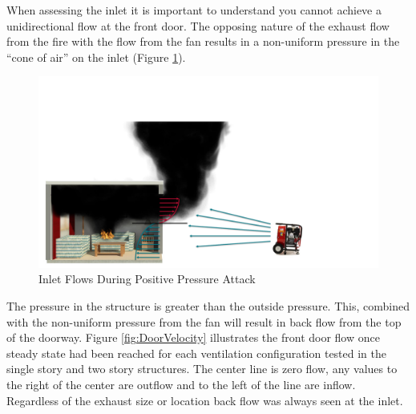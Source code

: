 \documentclass{article}
\begin{document}
When assessing the inlet it is important to understand you cannot achieve a unidirectional flow at the front door. The opposing nature of the exhaust flow from the fire with the flow from the fan results in a non-uniform pressure in the “cone of air” on the inlet (Figure \ref{fig:FanAndDoorFlow}).

\begin{figure}[H]
	\centering
	\includegraphics[width = 6in]{0_Images/Tactical_Considerations/Ongoing_Assessment/FanandDoorFlow.pdf}
	\caption{Inlet Flows During Positive Pressure Attack}
	\label{fig:FanAndDoorFlow}
\end{figure}

The pressure in the structure is greater than the outside pressure. This, combined with the non-uniform pressure from the fan will result in back flow from the top of the doorway. Figure \ref{fig:DoorVelocity} illustrates the front door flow once steady state had been reached for each ventilation configuration tested in the single story and two story structures. The center line is zero flow, any values to the right of the center are outflow and to the left of the line are inflow. Regardless of the exhaust size or location back flow was always seen at the inlet.
\end{document}

